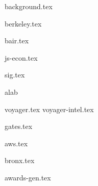 \documentclass[11pt]{article}
\begin{document}
{background.tex}


{berkeley.tex}


{bair.tex}

{js-econ.tex}

{sig.tex}

{alab}

{voyager.tex}
{voyager-intel.tex}

{gates.tex}

{aws.tex}

{bronx.tex}



{awards-gen.tex}
\end{document}
